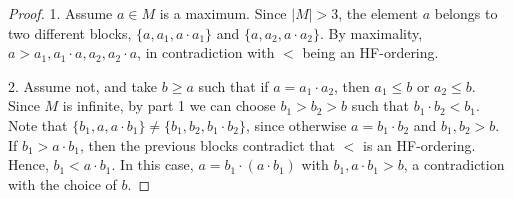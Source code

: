 \documentclass[10pt,a4paper]{article}
\theoremstyle{note}
\begin{document}
\begin{proof}
	1. Assume $a\in M$ is a maximum. Since $|M|>3$, the element $a$ belongs to two different blocks, $\{a,a_1,a\cdot a_1\}$ and $\{a,a_2,a\cdot a_2\}$.  By maximality, $a> a_1,a_1\cdot a, a_2, a_2\cdot a$, in contradiction with $<$ being an HF-ordering.
	
	2. Assume not, and take $b \geq a$ such that  if $a=a_1\cdot a_2$, then $a_1\leq b$ or $a_2\leq b$. Since $M$ is infinite, by part 1 we can choose $b_1>b_2>b$ such that  $b_1\cdot b_2<b_1$. Note that $\{b_1,a,a\cdot b_1\}\neq \{b_1,b_2, b_1\cdot b_2 \}$, since otherwise $a=b_1\cdot b_2$ and  $b_1,b_2>b$. If $b_ 1> a\cdot b_1$, then  the previous blocks contradict that $<$ is an HF-ordering. Hence, $b_1<a\cdot b_1$. In this case, $a= b_1\cdot (a\cdot b_1)$  with $b_1,a\cdot b_1>b$, a contradiction with the choice of $b$.
\end{proof}
\end{document}
